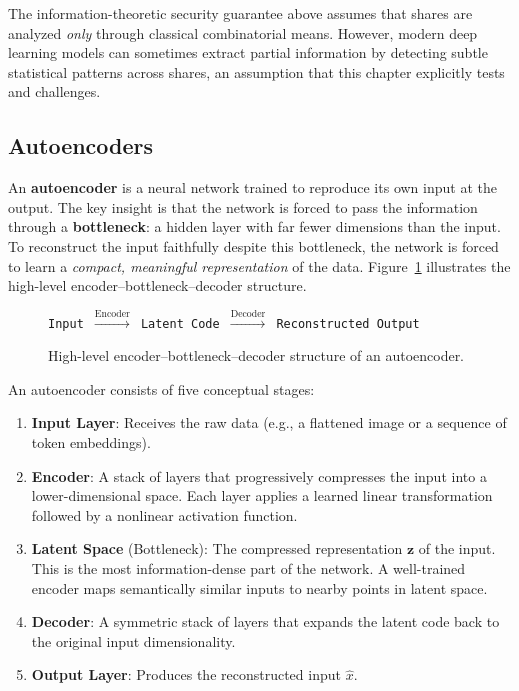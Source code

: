 The information-theoretic security guarantee above assumes that shares are analyzed \emph{only} through classical combinatorial means. However, modern deep learning models can sometimes extract partial information by detecting subtle statistical patterns across shares, an assumption that this chapter explicitly tests and challenges.

\subsection{Autoencoders}


An \textbf{autoencoder} is a neural network trained to reproduce its own input at the output. The key insight is that the network is forced to pass the information through a \textbf{bottleneck}: a hidden layer with far fewer dimensions than the input. To reconstruct the input faithfully despite this bottleneck, the network is forced to learn a \emph{compact, meaningful representation} of the data. Figure~\ref{fig:autoencoder_flow} illustrates the high-level encoder–bottleneck–decoder structure.

\begin{figure}[h]
\centering
\begin{minipage}{0.8\textwidth}
\centering
\texttt{Input $\xrightarrow{\text{Encoder}}$ Latent Code $\xrightarrow{\text{Decoder}}$ Reconstructed Output}
\end{minipage}
\caption{High-level encoder--bottleneck--decoder structure of an autoencoder.}
\label{fig:autoencoder_flow}
\end{figure}


An autoencoder consists of five conceptual stages:

\begin{enumerate}
    \item \textbf{Input Layer}: Receives the raw data (e.g., a flattened image or a sequence of token embeddings).
    \item \textbf{Encoder}: A stack of layers that progressively compresses the input into a lower-dimensional space. Each layer applies a learned linear transformation followed by a nonlinear activation function.
    \item \textbf{Latent Space} (Bottleneck): The compressed representation $\mathbf{z}$ of the input. This is the most information-dense part of the network. A well-trained encoder maps semantically similar inputs to nearby points in latent space.
    \item \textbf{Decoder}: A symmetric stack of layers that expands the latent code back to the original input dimensionality.
    \item \textbf{Output Layer}: Produces the reconstructed input $\hat{x}$.
\end{enumerate}


